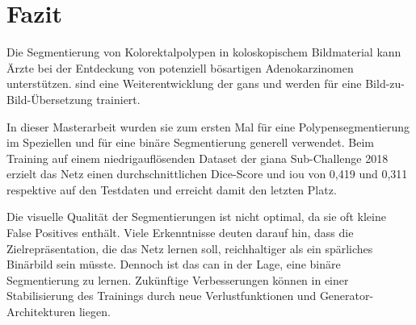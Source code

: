 \chapter{Fazit}

Die Segmentierung von Kolorektalpolypen in koloskopischem Bildmaterial kann Ärzte bei der Entdeckung von potenziell bösartigen Adenokarzinomen unterstützen.
 sind eine Weiterentwicklung der \glspl{gan} und werden für eine Bild-zu-Bild-Übersetzung trainiert.

In dieser Masterarbeit wurden sie zum ersten Mal für eine Polypensegmentierung im Speziellen und für eine binäre Segmentierung generell verwendet.
Beim Training auf einem niedrigauflösenden Dataset der \gls{giana} Sub-Challenge 2018 erzielt das Netz einen durchschnittlichen Dice-Score und \gls{iou} von 0,419 und 0,311 respektive auf den Testdaten und erreicht damit den letzten Platz.

Die visuelle Qualität der Segmentierungen ist nicht optimal, da sie oft kleine False Positives enthält.
Viele Erkenntnisse deuten darauf hin, dass die Zielrepräsentation, die das Netz lernen soll, reichhaltiger als ein spärliches Binärbild sein müsste.
Dennoch ist das \gls{can} in der Lage, eine binäre Segmentierung zu lernen.
Zukünftige Verbesserungen können in einer Stabilisierung des Trainings durch neue Verlustfunktionen und Generator-Architekturen liegen.
